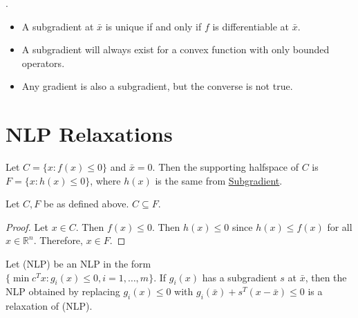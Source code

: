 \documentclass[a4paper]{report}
\begin{document}
\begin{proposition}\label{prop}
. \\
  \begin{itemize}
    \item A subgradient at $\bar x$ is unique if and only if $f$ is differentiable at $\bar x$.
    \item A subgradient will always exist for a convex function with only bounded operators. 
    \item Any gradient is also a subgradient, but the converse is not true.
  \end{itemize}
\end{proposition}

\section{NLP Relaxations}
\begin{definition}\label{supporting}
  Let $C = \{x : f(x) \leq 0\}$ and $\bar x = 0$. Then the supporting halfspace of $C$ is
  $F = \{x: h(x) \leq 0 \}$, where $h(x)$ is the same from \hyperref[subgradient]{Subgradient}.
\end{definition}
\begin{proposition}
  Let $C, F$ be as defined above. $C \subseteq F$. 
\end{proposition}
\begin{proof}
  Let $x \in C$. Then $f(x) \leq 0$. Then $h(x) \leq 0$ since $h(x) \leq f(x)$ for all $x \in \mathbb R^n$. Therefore, $x \in F$.
\end{proof}

\begin{corollary}\label{nlp}
  Let (NLP) be an NLP in the form \\$\{\min c^Tx : g_i(x) \leq 0, i = 1, \dots, m\}$. If $g_i(x)$ has a subgradient $s$ at $\bar x$, then the NLP obtained by replacing $g_i(x) \leq 0$ with $g_i(\bar x) + s^T(x - \bar x)\leq 0$ is a relaxation of (NLP).
\end{corollary}

\newpage
\end{document}
